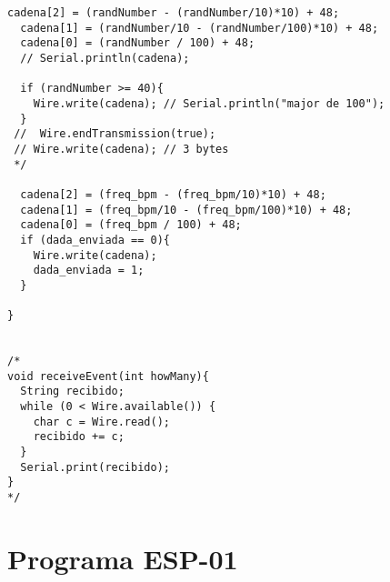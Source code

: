 \begin{lstlisting}[style=myArduino]
  cadena[2] = (randNumber - (randNumber/10)*10) + 48; 
  cadena[1] = (randNumber/10 - (randNumber/100)*10) + 48; 
  cadena[0] = (randNumber / 100) + 48; 
  // Serial.println(cadena);

  if (randNumber >= 40){
    Wire.write(cadena); // Serial.println("major de 100");
  }
 //  Wire.endTransmission(true);
 // Wire.write(cadena); // 3 bytes
 */
  
  cadena[2] = (freq_bpm - (freq_bpm/10)*10) + 48; 
  cadena[1] = (freq_bpm/10 - (freq_bpm/100)*10) + 48; 
  cadena[0] = (freq_bpm / 100) + 48; 
  if (dada_enviada == 0){
    Wire.write(cadena);
    dada_enviada = 1;
  }

}


/*
void receiveEvent(int howMany){
  String recibido;
  while (0 < Wire.available()) {
    char c = Wire.read();
    recibido += c;
  }
  Serial.print(recibido);
}
*/

\end{lstlisting}

\section{Programa ESP-01}

